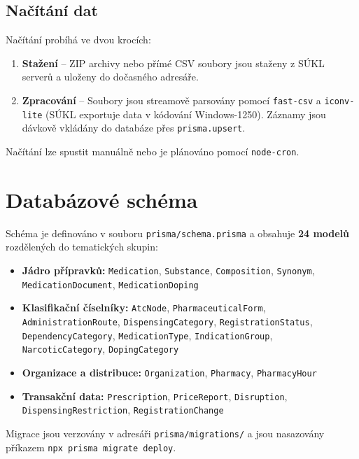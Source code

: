 \documentclass[12pt,a4paper]{article}
\begin{document}
\subsection{Načítání dat}

Načítání probíhá ve dvou krocích:
\begin{enumerate}
  \item \textbf{Stažení} -- ZIP archivy nebo přímé CSV soubory jsou staženy z SÚKL serverů a uloženy do dočasného adresáře.
  \item \textbf{Zpracování} -- Soubory jsou streamově parsovány pomocí \texttt{fast-csv} a \texttt{iconv-lite} (SÚKL exportuje data v kódování Windows-1250). Záznamy jsou dávkově vkládány do databáze přes \texttt{prisma.upsert}.
\end{enumerate}

Načítání lze spustit manuálně nebo je plánováno pomocí \texttt{node-cron}.

\section{Databázové schéma}

Schéma je definováno v souboru \texttt{prisma/schema.prisma} a obsahuje \textbf{24 modelů} rozdělených do tematických skupin:

\begin{itemize}
  \item \textbf{Jádro přípravků:} \texttt{Medication}, \texttt{Substance}, \texttt{Composition}, \texttt{Synonym}, \texttt{MedicationDocument}, \texttt{MedicationDoping}
  \item \textbf{Klasifikační číselníky:} \texttt{AtcNode}, \texttt{PharmaceuticalForm}, \texttt{AdministrationRoute}, \texttt{DispensingCategory}, \texttt{RegistrationStatus}, \texttt{DependencyCategory}, \texttt{MedicationType}, \texttt{IndicationGroup}, \texttt{NarcoticCategory}, \texttt{DopingCategory}
  \item \textbf{Organizace a distribuce:} \texttt{Organization}, \texttt{Pharmacy}, \texttt{PharmacyHour}
  \item \textbf{Transakční data:} \texttt{Prescription}, \texttt{PriceReport}, \texttt{Disruption}, \texttt{DispensingRestriction}, \texttt{RegistrationChange}
\end{itemize}

Migrace jsou verzovány v adresáři \texttt{prisma/migrations/} a jsou nasazovány příkazem \texttt{npx prisma migrate deploy}.
\end{document}
